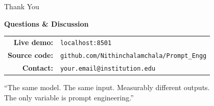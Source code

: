 \documentclass[aspectratio=169, 12pt]{beamer}
\begin{document}
\begin{frame}{Thank You}
  \begin{center}
    \Large\textbf{Questions \& Discussion}

    \vspace{1.5em}
    \normalsize
    \begin{tabular}{rl}
      \textbf{Live demo:}   & \texttt{localhost:8501} \\
      \textbf{Source code:} & \texttt{github.com/Nithinchalamchala/Prompt\_Engg} \\
      \textbf{Contact:}     & \texttt{your.email@institution.edu} \\
    \end{tabular}

    \vspace{1.5em}
    \textcolor{pfgray}{\small
      ``The same model. The same input. Measurably different outputs.\\
      The only variable is prompt engineering.''}
  \end{center}
\end{frame}

\end{document}
